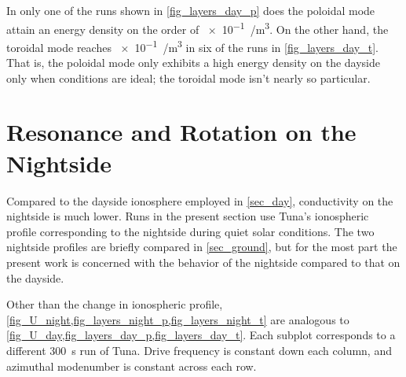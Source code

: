 In only one of the runs shown in \cref{fig_layers_day_p} does the poloidal mode
attain an energy density on the order of \SI{e-1}{\nJ/\meter\cubed}. On the
other hand, the toroidal mode reaches \about\SI{e-1}{\nJ/\meter\cubed} in six
of the runs in \cref{fig_layers_day_t}. That is, the poloidal mode only
exhibits a high energy density on the dayside only when conditions are ideal;
the toroidal mode isn't nearly so particular. 

\section{Resonance and Rotation on the Nightside}
  \label{sec_night}

Compared to the dayside ionosphere employed in \cref{sec_day}, conductivity on
the nightside is much lower. Runs in the present section use Tuna's ionospheric
profile corresponding to the nightside during quiet solar conditions. The two
nightside profiles are briefly compared in \cref{sec_ground}, but for the most
part the present work is concerned with the behavior of the nightside compared
to that on the dayside. 

Other than the change in ionospheric profile,
\cref{fig_U_night,fig_layers_night_p,fig_layers_night_t} are analogous to
\cref{fig_U_day,fig_layers_day_p,fig_layers_day_t}. Each subplot corresponds to
a different \SI{300}{\s} run of Tuna. Drive frequency is constant down each
column, and azimuthal modenumber is constant across each row. 

